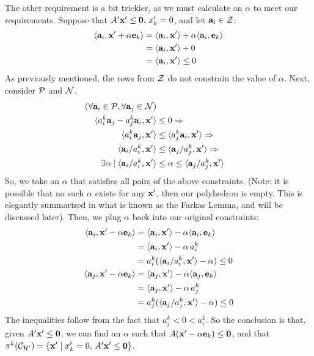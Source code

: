 The other requirement is a bit trickier, as we must calculate an $\alpha$ to meet our requirements.  Suppose that $A'\x' \leq \vec{0},\, x'_k = 0$, and let $\a_i \in \Z$:
\begin{align*}
\dotproduct{\a_i}{\x' + \alpha \e_k} 
            &= \dotproduct{\a_i}{\x'} + \alpha\dotproduct{\a_i}{\e_k} \\
            &= \dotproduct{\a_i}{\x'} + 0 \\
            &= \dotproduct{\a_i}{\x'} \leq 0
\end{align*}
As previously mentioned, the rows from $\Z$ do not constrain the value of $\alpha$.  Next, consider $\P$ and $\N$.
\begin{align*}
 (\forall \a_i \in \P, \forall \a_j \in \N) \\
     \quad \dotproduct{a_i^k \a_j - a_j^k \a_i}{\x'} &\leq 0 \Rightarrow \\
     \quad \dotproduct{a_i^k \a_j}{\x'} 
          &\leq \dotproduct{a_j^k \a_i}{\x'} \Rightarrow \\
     \quad \dotproduct{\a_i /a_i^k}{\x'}
          &\leq \dotproduct{\a_j /a_j^k}{\x'} \Rightarrow \\
     \exists \alpha \suchthat \dotproduct{\a_i /a_i^k}{\x'}
          &\leq \alpha \leq \dotproduct{\a_j /a_j^k}{\x'}
\end{align*}
So, we take an $\alpha$ that satisfies all pairs of the above constraints.  (Note: it is possible that no such $\alpha$ exists for any $\x'$, then our polyhedron is empty.  This is elegantly summarized in what is known as the Farkas Lemma, and will be discussed later).  Then, we plug $\alpha$ back into our original constraints:
\begin{align*}
  \dotproduct{\a_i}{\x' - \alpha \e_k} 
      &= \dotproduct{\a_i}{\x'} - \alpha\dotproduct{\a_i}{\e_k} \\
      &= \dotproduct{\a_i}{\x'} - \alpha\,a_i^k \\
      &= a_i^k(\dotproduct{\a_i/a_i^k}{\x'} - \alpha) \leq 0 \\
  \dotproduct{\a_j}{\x' - \alpha \e_k} 
      &= \dotproduct{\a_j}{\x'} - \alpha\dotproduct{\a_j}{\e_k} \\
      &= \dotproduct{\a_j}{\x'} - \alpha\,a_j^k \\
      &= a_j^k(\dotproduct{\a_j/a_j^k}{\x'} - \alpha) \leq 0
\end{align*}
The inequalities follow from the fact that $a_j^k < 0 < a_i^k$.  So the conclusion is that, given $A'\x' \leq \vec{0}$, we can find an $\alpha$ such that $A(\x'-\alpha\e_k) \leq \vec{0}$, and that $\pi^k(\CHp) = \{\x'\suchthat x'_k = 0,\, A'\x' \leq \vec{0}\}$.

